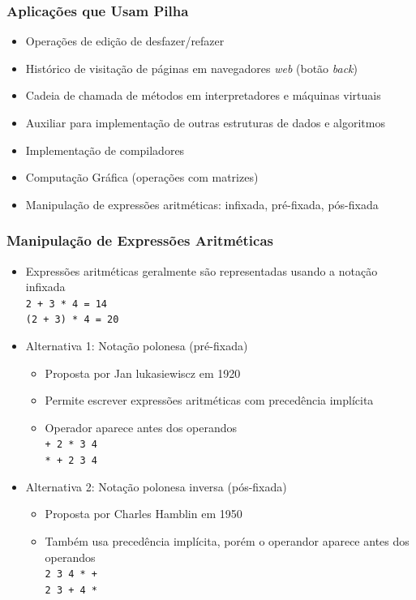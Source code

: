 \documentclass[aspectratio=169]{beamer}
\begin{document}
\begin{frame}\frametitle{Aplicações que Usam Pilha}
\begin{itemize}
	\item Operações de edição de desfazer/refazer
	\item Histórico de visitação de páginas em navegadores \emph{web} (botão \emph{back})
	\item Cadeia de chamada de métodos em interpretadores e máquinas virtuais
	\item Auxiliar para implementação de outras estruturas de dados e algoritmos
	\item Implementação de compiladores
	\item Computação Gráfica (operações com matrizes)
	\item Manipulação de expressões aritméticas: infixada, pré-fixada, pós-fixada
\end{itemize}
\end{frame}

\begin{frame}\frametitle{Manipulação de Expressões Aritméticas}
\begin{itemize}
	\item Expressões aritméticas geralmente são representadas usando a notação infixada\\
		\texttt{2 + 3 * 4 = 14}\\
		\texttt{(2 + 3) * 4 = 20}
	\item Alternativa 1: Notação polonesa (pré-fixada)
	\begin{itemize}
		\item Proposta por Jan lukasiewiscz em 1920
		\item Permite escrever expressões aritméticas com precedência implícita
		\item Operador aparece antes dos operandos\\
			\texttt{+ 2 * 3 4}\\
			\texttt{* + 2 3 4}
	\end{itemize}
	\item Alternativa 2: Notação polonesa inversa (pós-fixada)
	\begin{itemize}
		\item Proposta por Charles Hamblin em 1950
		\item Também usa precedência implícita, porém o operandor aparece antes dos operandos\\
			\texttt{2 3 4 * +}\\
			\texttt{2 3 + 4 *}
	\end{itemize}
\end{itemize}
\end{frame}
\end{document}

